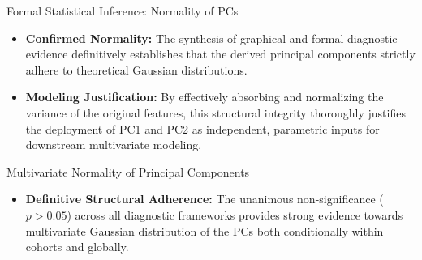 \documentclass[8pt, aspectratio=169]{beamer}
\begin{document}
\begin{frame}{Formal Statistical Inference: Normality of PCs}
    \vspace{0.4cm}
    \begin{itemize}
        \item \textbf{Confirmed Normality:} The synthesis of graphical and formal diagnostic evidence definitively establishes that the derived principal components strictly adhere to theoretical Gaussian distributions.
        \item \textbf{Modeling Justification:} By effectively absorbing and normalizing the variance of the original features, this structural integrity thoroughly justifies the deployment of PC1 and PC2 as independent, parametric inputs for downstream multivariate modeling.
    \end{itemize}
\end{frame}

\begin{frame}{Multivariate Normality of Principal Components}
    \begin{table}
        \centering
    \end{table}

    \vspace{0.4cm}
    \begin{itemize}
        \item \textbf{Definitive Structural Adherence:} The unanimous non-significance ($p > 0.05$) across all diagnostic frameworks provides strong evidence towards multivariate Gaussian distribution of the PCs both conditionally within cohorts and globally.

    \end{itemize}
\end{frame}
\end{document}

